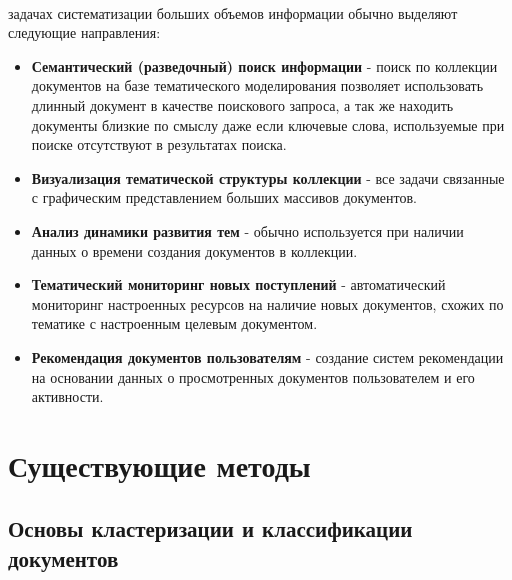 ~\

 задачах систематизации больших объемов информации обычно выделяют следующие направления:

\begin{itemize}
    \item \textbf{Семантический (разведочный) поиск информации} - поиск по коллекции документов на базе тематического моделирования позволяет использовать длинный документ в качестве поискового запроса, а так же находить документы близкие по смыслу даже если ключевые слова, используемые при поиске отсутствуют в результатах поиска.
    \item \textbf{Визуализация тематической структуры коллекции} - все задачи связанные с графическим представлением больших массивов документов.
    \item \textbf{Анализ динамики развития тем} - обычно используется при наличии данных о времени создания документов в коллекции.
    \item \textbf{Тематический мониторинг новых поступлений} - автоматический мониторинг настроенных ресурсов на наличие новых документов, схожих по тематике с настроенным целевым документом.
    \item \textbf{Рекомендация документов пользователям} - создание систем рекомендации на основании данных о просмотренных документов пользователем и его активности.
\end{itemize}

%
\section{Существующие методы}
\subsection{Основы кластеризации и классификации документов}

